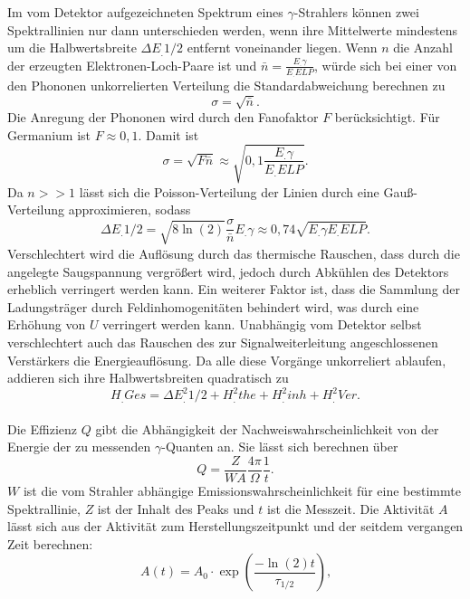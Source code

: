 Im vom Detektor aufgezeichneten Spektrum eines $\gamma$-Strahlers können zwei Spektrallinien nur dann unterschieden werden, wenn ihre Mittelwerte mindestens um die Halbwertsbreite $\Delta E_.{1/2}$ entfernt voneinander liegen.
Wenn $n$ die Anzahl der erzeugten Elektronen-Loch-Paare ist und $\bar{n}=\frac{E_.{\gamma}}{E_.{ELP}}$, würde sich bei einer von den Phononen unkorrelierten Verteilung die Standardabweichung berechnen zu
\[
\sigma=\sqrt{\bar{n}}\text{.}
\]
Die Anregung der Phononen wird durch den Fanofaktor $F$ berücksichtigt. Für Germanium ist $F\approx 0,1$.
Damit ist 
\[
\sigma=\sqrt{F\bar{n}}\approx\sqrt{0,1\frac{E_.{\gamma}}{E_.{ELP}}}\text{.}\label{eq:sig}
\]
Da $n>>1$ lässt sich die Poisson-Verteilung der Linien durch eine Gauß-Verteilung approximieren, sodass
\begin{equation}
\Delta E_.{1/2}=\sqrt{8\ln(2)}\frac{\sigma}{\bar{n}}E_.{\gamma}\approx 0,74\sqrt{E_.{\gamma}E_.{ELP}}\text{.}\label{eq:dE}
\end{equation}
Verschlechtert wird die Auflösung durch das thermische Rauschen, dass durch die angelegte Saugspannung vergrößert wird, jedoch durch Abkühlen des Detektors erheblich verringert werden kann. Ein weiterer Faktor ist, dass die Sammlung der Ladungsträger durch Feldinhomogenitäten behindert wird, was durch eine Erhöhung von $U$ verringert werden kann. Unabhängig vom Detektor selbst verschlechtert auch das Rauschen des zur Signalweiterleitung angeschlossenen Verstärkers die Energieauflösung. Da alle diese Vorgänge unkorreliert ablaufen, addieren sich ihre Halbwertsbreiten quadratisch zu
\begin{equation}
H_.{Ges}=\Delta E^2_.{1/2} + H^2_.{the} + H^2_.{inh} + H^2_.{Ver}\text{.}\label{eq:HGes}
\end{equation}
\\
Die Effizienz $Q$ gibt die Abhängigkeit der Nachweiswahrscheinlichkeit von der Energie der zu messenden $\gamma$-Quanten an.
Sie lässt sich berechnen über
\begin{equation}
Q=\frac{Z}{W A}\frac{4\pi}{\Omega}\frac{1}{t}\text{.}\label{eq:Q}
\end{equation}
$W$ ist die vom Strahler abhängige Emissionswahrscheinlichkeit für eine bestimmte Spektrallinie, $Z$ ist der Inhalt des Peaks und $t$ ist die Messzeit.
Die Aktivität $A$ lässt sich aus der Aktivität zum Herstellungszeitpunkt und der seitdem vergangen Zeit berechnen:
\begin{equation}
A(t) = A_0\cdot \exp\left(\frac{-\ln(2)t}{\tau_{1/2}}\right)\text{,}\label{eq:A} 
\end{equation}
